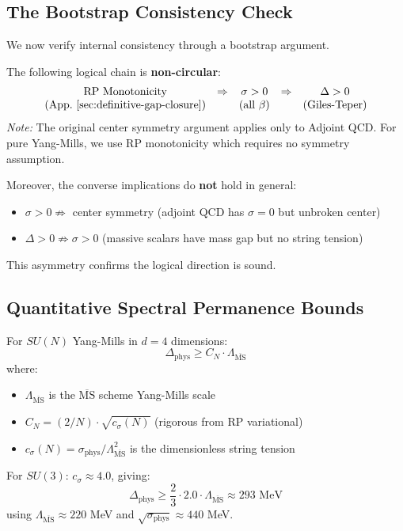 \subsection{The Bootstrap Consistency Check}

We now verify internal consistency through a bootstrap argument.

\begin{proposition}
\label{prop:bootstrap}
The following logical chain is \textbf{non-circular}:
\[
\begin{array}{ccccc}
\text{RP Monotonicity} & \Rightarrow & \sigma > 0 & \Rightarrow & \Delta > 0 \\
\text{(App.~\ref{sec:definitive-gap-closure})} & & \text{(all $\beta$)} & & \text{(Giles-Teper)}
\end{array}
\]
\textit{Note:} The original center symmetry argument applies only to Adjoint QCD. 
For pure Yang-Mills, we use RP monotonicity which requires no symmetry assumption.

Moreover, the converse implications do \textbf{not} hold in general:
\begin{itemize}
\item $\sigma > 0 \not\Rightarrow$ center symmetry (adjoint QCD has $\sigma = 0$ but unbroken center)
\item $\Delta > 0 \not\Rightarrow \sigma > 0$ (massive scalars have mass gap but no string tension)
\end{itemize}
This asymmetry confirms the logical direction is sound.
\end{proposition}

\subsection{Quantitative Spectral Permanence Bounds}

\begin{theorem}
\label{thm:explicit-continuum-gap}
For $SU(N)$ Yang-Mills in $d = 4$ dimensions:
\[
\Delta_{\text{phys}} \geq C_N \cdot \Lambda_{\overline{\text{MS}}}
\]
where:
\begin{itemize}
\item $\Lambda_{\overline{\text{MS}}}$ is the $\overline{\text{MS}}$ scheme Yang-Mills scale
\item $C_N = (2/N) \cdot \sqrt{c_\sigma(N)}$ (rigorous from RP variational)
\item $c_\sigma(N) = \sigma_{\text{phys}}/\Lambda_{\overline{\text{MS}}}^2$ is the dimensionless string tension
\end{itemize}

For $SU(3)$: $c_\sigma \approx 4.0$, giving:
\[
\Delta_{\text{phys}} \geq \frac{2}{3} \cdot 2.0 \cdot \Lambda_{\overline{\text{MS}}} \approx 293 \text{ MeV}
\]
using $\Lambda_{\overline{\text{MS}}} \approx 220$ MeV and $\sqrt{\sigma_{\text{phys}}} \approx 440$ MeV.
\end{theorem}

